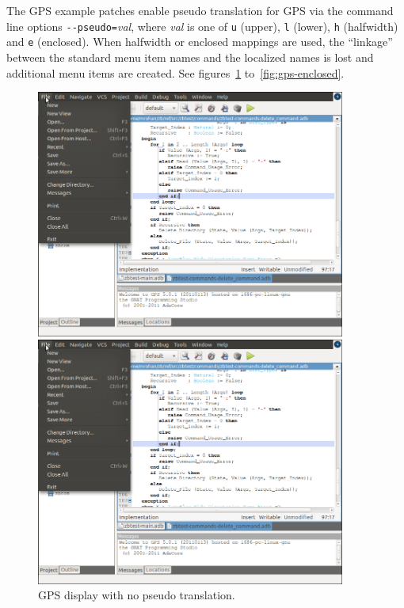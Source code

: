 The GPS example patches enable pseudo translation for GPS via the command
line options \verb|--pseudo=|\textit{val}, where \textit{val} is one of
\texttt{u} (upper), \texttt{l} (lower), \texttt{h} (halfwidth) and
\texttt{e} (enclosed).  When halfwidth or enclosed mappings are used, the
``linkage'' between the standard menu item names and the localized names is
lost and additional menu items are created.  See figures~\ref{fig:gps-normal}
to~\ref{fig:gps-enclosed}.
\begin{figure}
\begin{center}
\begin{latexonly}
    \includegraphics[angle=90,width=4in]{images/gps-normal.png}
\end{latexonly}
\begin{htmlonly}
    \includegraphics[width=4in]{images/gps-normal.png}
\end{htmlonly}
\end{center}
\caption{GPS display with no pseudo translation.}
\label{fig:gps-normal}
\end{figure}

